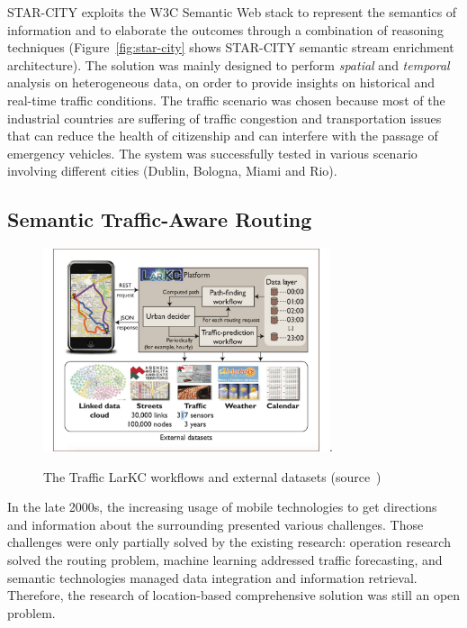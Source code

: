 STAR-CITY exploits the W3C Semantic Web stack to represent the semantics of information and to elaborate the outcomes through a combination of reasoning techniques (Figure~\ref{fig:star-city} shows STAR-CITY semantic stream enrichment architecture). The solution was mainly designed to perform \textit{spatial} and \textit{temporal} analysis on heterogeneous data, on order to provide insights on historical and real-time traffic conditions.
The traffic scenario was chosen because most of the industrial countries are suffering of traffic congestion and transportation issues that can reduce the health of citizenship and can interfere with the passage of emergency vehicles.
The system was successfully tested in various scenario involving different cities (Dublin, Bologna, Miami and Rio).

\subsection{Semantic Traffic-Aware Routing} \label{sec:uda-trafficlark}

\begin{figure}[t]
	\centering
	\includegraphics[width=0.75\textwidth]{img/traffic-lark.pdf}.
    \caption{The Traffic LarKC workflows and external datasets (source~\cite{DBLP:journals/internet/ValleCDGST11})}
    \label{fig:traffic-lark}
\end{figure}

In the late 2000s, the increasing usage of mobile technologies to get directions and information about the surrounding presented various challenges. Those challenges were only partially solved by the existing research: operation research solved the routing problem, machine learning addressed traffic forecasting, and semantic technologies managed data integration and information retrieval. Therefore, the research of location-based comprehensive solution was still an open problem.

